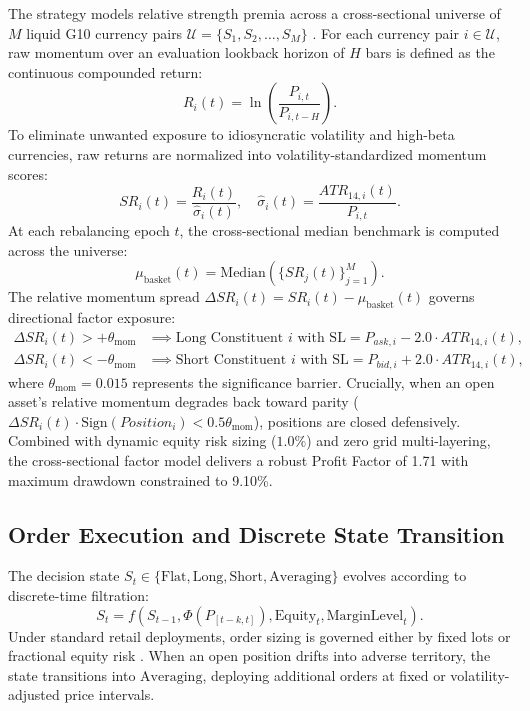 \documentclass[11pt,a4paper]{article}
\begin{document}
The strategy models relative strength premia across a cross-sectional universe of $M$ liquid G10 currency pairs $\mathcal{U} = \{S_1, S_2, \dots, S_M\}$ \cite{menkhoff2012currency, asness2013value}.
For each currency pair $i \in \mathcal{U}$, raw momentum over an evaluation lookback horizon of $H$ bars is defined as the continuous compounded return:
\begin{equation}
R_i(t) = \ln\left(\frac{P_{i, t}}{P_{i, t-H}}\right).
\end{equation}
To eliminate unwanted exposure to idiosyncratic volatility and high-beta currencies, raw returns are normalized into volatility-standardized momentum scores:
\begin{equation}
SR_i(t) = \frac{R_i(t)}{\hat{\sigma}_i(t)}, \quad \hat{\sigma}_i(t) = \frac{ATR_{14, i}(t)}{P_{i, t}}.
\end{equation}
At each rebalancing epoch $t$, the cross-sectional median benchmark is computed across the universe:
\begin{equation}
\mu_{\text{basket}}(t) = \text{Median}\left(\{SR_j(t)\}_{j=1}^M\right).
\end{equation}
The relative momentum spread $\Delta SR_i(t) = SR_i(t) - \mu_{\text{basket}}(t)$ governs directional factor exposure:
\begin{align}
\Delta SR_i(t) > +\theta_{\text{mom}} & \implies \text{Long Constituent } i \text{ with } \text{SL} = P_{ask, i} - 2.0 \cdot ATR_{14, i}(t), \\
\Delta SR_i(t) < -\theta_{\text{mom}} & \implies \text{Short Constituent } i \text{ with } \text{SL} = P_{bid, i} + 2.0 \cdot ATR_{14, i}(t),
\end{align}
where $\theta_{\text{mom}} = 0.015$ represents the significance barrier. Crucially, when an open asset's relative momentum degrades back toward parity ($\Delta SR_i(t) \cdot \text{Sign}(Position_i) < 0.5 \theta_{\text{mom}}$), positions are closed defensively. Combined with dynamic equity risk sizing ($1.0\%$) and zero grid multi-layering, the cross-sectional factor model delivers a robust Profit Factor of 1.71 with maximum drawdown constrained to 9.10\%.


\subsection{Order Execution and Discrete State Transition}
The decision state $S_t \in \{\text{Flat}, \text{Long}, \text{Short}, \text{Averaging}\}$ evolves according to discrete-time filtration:
\begin{equation}
S_{t} = f(S_{t-1}, \Phi(P_{[t-k, t]}), \text{Equity}_t, \text{MarginLevel}_t).
\end{equation}
Under standard retail deployments, order sizing is governed either by fixed lots or fractional equity risk \cite{lopez2018advances, carhart1997persistence}. When an open position drifts into adverse territory, the state transitions into $\text{Averaging}$, deploying additional orders at fixed or volatility-adjusted price intervals.
\end{document}
